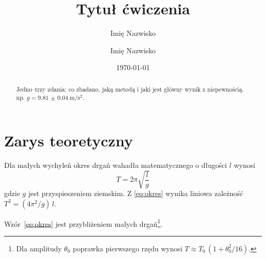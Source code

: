 \documentclass[a4paper, polish, 11pt]{scrartcl}
\title{Tytuł ćwiczenia}
\author{Imię Nazwisko \and Imię Nazwisko}
\date{\today}
\begin{document}
\maketitle

\begin{abstract}
Jedno–trzy zdania: co zbadano, jaką metodą i jaki jest główny wynik z niepewnością, np. $g = \qty{9.81(4)}{\metre\per\second\squared}$.
\end{abstract}

\begincolumns

\section{Zarys teoretyczny}\label{sec:teoria}

Dla małych wychyleń okres drgań wahadła matematycznego o długości $l$ wynosi
\begin{equation}
	T = 2\pi\sqrt{\frac{l}{g}}
	\label{eq:okres}
\end{equation}
gdzie $g$ jest przyspieszeniem ziemskim. Z \cref{eq:okres} wynika liniowa zależność $T^2 = (4\pi^2/g)\,l$.

Wzór~\eqref{eq:okres} jest przybliżeniem małych drgań\footnote{Dla amplitudy $\theta_0$ poprawka pierwszego rzędu wynosi $T \approx T_0\,(1 + \theta_0^2/16)$.}.
\end{document}
